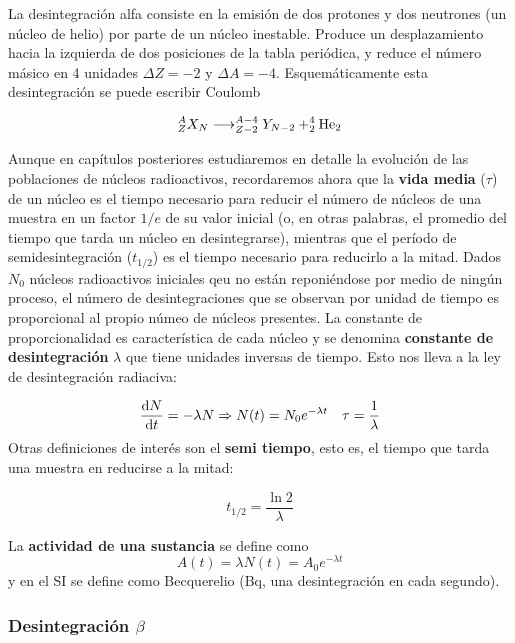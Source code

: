 La desintegración alfa consiste en la emisión de dos protones y dos neutrones (un núcleo de helio) por parte de un núcleo inestable. Produce un desplazamiento hacia la izquierda de dos posiciones de la tabla periódica, y reduce el número másico en 4 unidades $\Delta Z = -2$ y $\Delta A  = -4$. Esquemáticamente esta desintegración se puede escribir Coulomb

\begin{equation}
	^A_Z X_N \longrightarrow ^{A-4}_{Z-2} Y_{N-2} + ^4_2\text{He}_2
\end{equation}

Aunque en capítulos posteriores estudiaremos en detalle la evolución de las poblaciones de núcleos radioactivos, recordaremos ahora que la \textbf{vida media} ($\tau$) de un núcleo es el tiempo necesario para reducir el número de núcleos de una muestra en un factor $1/e$ de su valor inicial (o, en otras palabras, el promedio del tiempo que tarda un núcleo en desintegrarse), mientras que el período de semidesintegración ($t_{1/2}$) es el tiempo necesario para reducirlo a la mitad. Dados $N_0$ núcleos radioactivos iniciales qeu no están reponiéndose por medio de ningún proceso, el número de desintegraciones que se observan por unidad de tiempo es proporcional al propio númeo de núcleos presentes. La constante de proporcionalidad es característica de cada núcleo y se denomina \textbf{constante de desintegración} $\lambda$ que tiene unidades inversas de tiempo. Esto nos lleva a la ley de desintegración radiaciva:

\begin{equation}
	\frac{\mathrm{d} N}{\mathrm{d} t} = - \lambda N \Rightarrow N (t)  = N_0 e^{-\lambda t} \quad \tau = \frac{1}{\lambda}
\end{equation}
Otras definiciones de interés son el \textbf{semi tiempo}, esto es, el tiempo que tarda una muestra en reducirse a la mitad:

\begin{equation}
	t_{1/2} = \frac{\ln 2}{\lambda}
\end{equation}

La \textbf{actividad de una sustancia} se define como
\begin{equation}
	A(t)=\lambda N(t)  = A_0 e^{-\lambda t}
\end{equation}
y en el SI se define como Becquerelio (Bq, una desintegración en cada segundo).

\subsubsection{Desintegración $\beta$}

